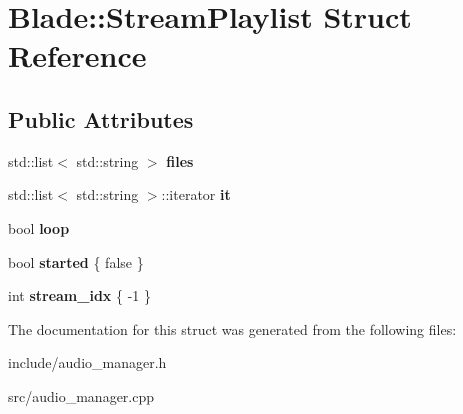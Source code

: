 \hypertarget{struct_blade_1_1_stream_playlist}{}\section{Blade\+:\+:Stream\+Playlist Struct Reference}
\label{struct_blade_1_1_stream_playlist}
\subsection*{Public Attributes}
\begin{DoxyCompactItemize}
\item 
\mbox{\label{struct_blade_1_1_stream_playlist_afbc780864cab94c6f1ea7ee6ca5085f8}} 
std\+::list$<$ std\+::string $>$ {\bfseries files}
\item 
\mbox{\label{struct_blade_1_1_stream_playlist_a2440c4498a98cc6b47173704e3f498ce}} 
std\+::list$<$ std\+::string $>$\+::iterator {\bfseries it}
\item 
\mbox{\label{struct_blade_1_1_stream_playlist_a709c99d0848e94ac4e5b55d0e8a18670}} 
bool {\bfseries loop}
\item 
\mbox{\label{struct_blade_1_1_stream_playlist_a64f85446eaf714dc93046ea57d9f02ca}} 
bool {\bfseries started} \{ false \}
\item 
\mbox{\label{struct_blade_1_1_stream_playlist_a5a7e3b5a591369d981477ba7e53fc68c}} 
int {\bfseries stream\+\_\+idx} \{ -\/1 \}
\end{DoxyCompactItemize}


The documentation for this struct was generated from the following files\+:\begin{DoxyCompactItemize}
\item 
include/audio\+\_\+manager.\+h\item 
src/audio\+\_\+manager.\+cpp\end{DoxyCompactItemize}
